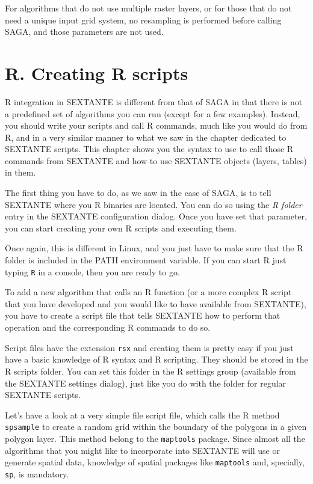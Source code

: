 For algorithms that do not use multiple raster layers, or for those that do not need a unique input grid system, no resampling is performed before calling SAGA, and those parameters are not used.

\section{R. Creating R scripts}\label{rscripts}

R integration in SEXTANTE is different from that of SAGA in that there is not a predefined set of algorithms you can run (except for a few examples). Instead, you should write your scripts and call R commands, much like you would do from R, and in a very similar manner to what we saw in the chapter dedicated to SEXTANTE scripts. This chapter shows you the syntax to use to call those R commands from SEXTANTE and how to use SEXTANTE objects (layers, tables) in them.

The first thing you have to do, as we saw in the case of SAGA, is to tell SEXTANTE where you R binaries are located. You can do so using the \emph{R folder} entry in the SEXTANTE configuration dialog. Once you have set that parameter, you can start creating your own R scripts and executing them.

Once again, this is different in Linux, and you just have to make sure that the R folder is included in the PATH environment variable. If you can start R just typing \texttt{R} in a console, then you are ready to go.

To add a new algorithm that calls an R function (or a more complex R script that you have developed and you would like to have available from SEXTANTE), you have to create a script file that tells SEXTANTE how to perform that operation and the corresponding R commands to do so.

Script files have the extension \texttt{rsx} and creating them is pretty easy if you just have a basic knowledge of R syntax and R scripting. They should be stored in the R scripts folder. You can set this folder in the R settings group (available from the SEXTANTE settings dialog), just like you do with the folder for regular SEXTANTE scripts. 

Let's have a look at a very simple file script file, which calls the R method \texttt{spsample} to create a random grid within the boundary of the polygons in a given polygon layer. This method belong to the \texttt{maptools} package. Since almost all the algorithms that you might like to incorporate into SEXTANTE will use or generate spatial data, knowledge of spatial packages like \texttt{maptools} and, specially, \texttt{sp}, is mandatory.

